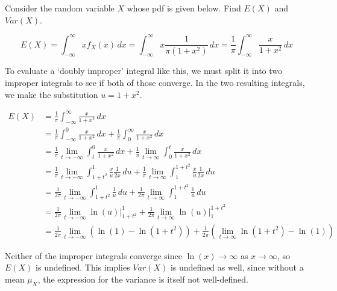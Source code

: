 \begin{example}\label{FatTailMean}
Consider the random variable $X$ whose pdf is given below. Find $E(X)$ and $Var(X)$.
\begin{center}
    \begin{minipage}{.5\textwidth}
        \centering
{}
\vspace{1.25em}
    \end{minipage}%
    \begin{minipage}{0.5\textwidth}
        \centering
\end{minipage}
\end{center}

$$E(X) = \int_{-\infty}^{\infty} x f_X(x) \, dx = \int_{-\infty}^{\infty} x \frac{1}{\pi(1+x^2)} \, dx = \frac{1}{\pi}\int_{-\infty}^{\infty} \frac{x}{1+x^2} \, dx$$

To evaluate a `doubly improper' integral like this, we must split it into two improper integrals to see if both of those converge. In the two resulting integrals, we make the substitution $u = 1+x^2$.

$$\begin{aligned}E(X) &= \frac{1}{\pi}\int_{-\infty}^{\infty} \frac{x}{1+x^2} \, dx \\
&= \frac{1}{\pi}\int_{-\infty}^{0} \frac{x}{1+x^2} \, dx + \frac{1}{\pi}\int_{0}^{\infty} \frac{x}{1+x^2} \, dx \\
&= \frac{1}{\pi} \lim_{t \to -\infty}\int_{t}^{0} \frac{x}{1+x^2} \, dx + \frac{1}{\pi}\lim_{t \to \infty}\int_{0}^{t} \frac{x}{1+x^2} \, dx \\
&= \frac{1}{\pi}\lim_{t \to -\infty}\int_{1+t^2}^{1} \frac{x}{u} \frac{1}{2x}\, du + \frac{1}{\pi}\lim_{t \to \infty}\int_{1}^{1+t^2} \frac{x}{u} \frac{1}{2x}\, du \\
&= \frac{1}{2\pi}\lim_{t \to -\infty}\int_{1+t^2}^{1} \frac{1}{u} \, du + \frac{1}{2\pi}\lim_{t \to \infty}\int_{1}^{1+t^2} \frac{1}{u} \, du \\ 
&= \frac{1}{2\pi}\lim_{t \to -\infty}\ln(u) \biggr|_{1+t^2}^{1} + \frac{1}{2\pi}\lim_{t \to \infty}\ln(u) \biggr|_{1}^{1+t^2} \\
&= \frac{1}{2\pi}\lim_{t \to -\infty}\left(\ln(1) - \ln(1+t^2) \right) + \frac{1}{2\pi}\left(\lim_{t \to \infty}\ln(1+t^2) - \ln(1)\right)\end{aligned}$$

Neither of the improper integrals converge since $\ln(x) \to \infty$ as $x \to \infty$, so $E(X)$ is undefined. This implies $Var(X)$ is undefined as well, since without a mean $\mu_X$, the expression for the variance is itself not well-defined.
\end{example}

